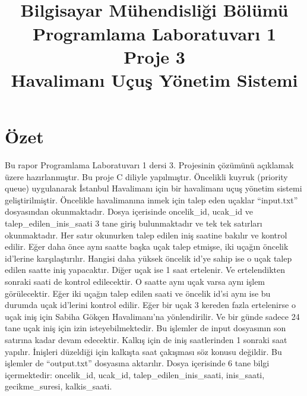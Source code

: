 \documentclass[conference]{IEEEtran}
\begin{document}
\title { \\
\LARGE {Bilgisayar Mühendisliği Bölümü}\\
\huge \textbf{Programlama Laboratuvarı 1}\\
\LARGE{Proje 3}\\
\LARGE{Havalimanı Uçuş Yönetim Sistemi}
}

\author
{


\and
{}
}


\maketitle
\section*{\textbf{\LARGE Özet}}
\Large{ Bu rapor Programlama Laboratuvarı 1 dersi 3. Projesinin çözümünü açıklamak üzere hazırlanmıştır. Bu proje C diliyle yapılmıştır. Öncelikli kuyruk (priority queue) uygulanarak İstanbul Havalimanı için bir havalimanı uçuş yönetim sistemi geliştirilmiştir.
Öncelikle havalimanına inmek için talep eden uçaklar “input.txt” dosyasından okunmaktadır. Dosya içerisinde oncelik\_id, ucak\_id ve talep\_edilen\_inis\_saati 3 tane giriş bulunmaktadır ve tek tek satırları okunmaktadır. Her satır okunurken talep edilen iniş saatine bakılır ve kontrol edilir. Eğer daha önce aynı saatte başka uçak talep etmişse, iki uçağın öncelik id’lerine karşılaştırılır. Hangisi daha yüksek öncelik id’ye sahip ise o uçak talep edilen saatte iniş yapacaktır. Diğer uçak ise 1 saat ertelenir. Ve ertelendikten sonraki saati de kontrol edilecektir.  O saatte aynı uçak varsa aynı işlem görülecektir. Eğer iki uçağın talep edilen saati ve öncelik id’si aynı ise bu durumda uçak id’lerini kontrol edilir. Eğer bir uçak 3 kereden fazla ertelenirse o uçak iniş için Sabiha Gökçen Havalimanı’na yönlendirilir. Ve bir günde sadece 24 tane uçak iniş için izin isteyebilmektedir. Bu işlemler de input dosyasının son satırına kadar devam edecektir. 
Kalkış için de iniş saatlerinden 1 sonraki saat yapılır. İnişleri düzeldiği için kalkışta saat çakışması söz konusu değildir. Bu işlemler de “output.txt” dosyasına aktarılır. Dosya içerisinde 6 tane bilgi içermektedir: oncelik\_id, ucak\_id, talep\_edilen\_inis\_saati, inis\_saati, gecikme\_suresi, kalkis\_saati.
}
\end{document}
